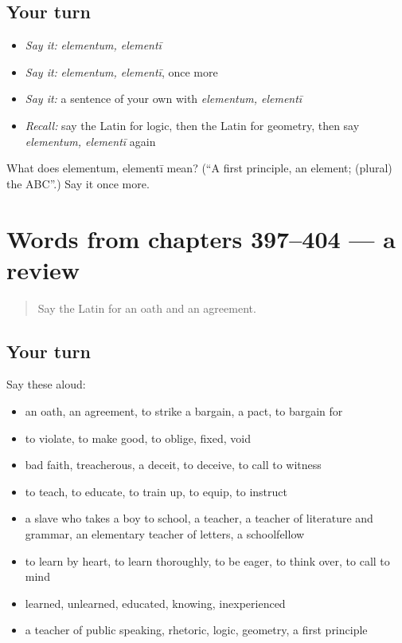 \subsection*{Your turn}
\begin{itemize}
\raggedright
  \item \emph{Say it:} \emph{elementum, elementī}
  \item \emph{Say it:} \emph{elementum, elementī}, once more
  \item \emph{Say it:} a sentence of your own with \emph{elementum, elementī}
  \item \emph{Recall:} say the Latin for logic, then the Latin for geometry, then say \emph{elementum, elementī} again
\end{itemize}

\begin{tcolorbox}[breakable,colback=teal!4,colframe=teal!35!black,title={Before you move on}]
What does elementum, elementī mean? (\textquotedblleft{}A first principle, an element; (plural) the ABC\textquotedblright{}.) Say it once more.
\end{tcolorbox}
\section[(dialogue)]{Words from chapters 397–404 — a review}

\label{lesson:LA-R404-review-397-404}



\begin{quote}
Say the Latin for an oath and an agreement.
\end{quote}

\subsection*{Your turn}
Say these aloud:

\begin{itemize}
\raggedright
  \item an oath, an agreement, to strike a bargain, a pact, to bargain for
  \item to violate, to make good, to oblige, fixed, void
  \item bad faith, treacherous, a deceit, to deceive, to call to witness
  \item to teach, to educate, to train up, to equip, to instruct
  \item a slave who takes a boy to school, a teacher, a teacher of literature and grammar, an elementary teacher of letters, a schoolfellow
  \item to learn by heart, to learn thoroughly, to be eager, to think over, to call to mind
  \item learned, unlearned, educated, knowing, inexperienced
  \item a teacher of public speaking, rhetoric, logic, geometry, a first principle
\end{itemize}

